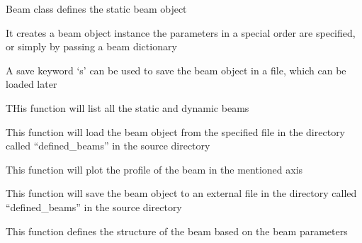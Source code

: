 \documentclass[letterpaper,10pt,english]{sphinxmanual}
\begin{document}

\begin{fulllineitems}
\label{beam:beam.staticbeam}
Beam class defines the static beam object

It creates a beam object instance the parameters in a special order are specified, or simply by passing a beam dictionary

A save keyword `s' can be used to save the beam object in a file, which can be loaded later

\begin{fulllineitems}
\label{beam:beam.staticbeam.listfiles}
THis function will list all the static and dynamic beams

\end{fulllineitems}


\begin{fulllineitems}
\label{beam:beam.staticbeam.load}
This function will load the beam object from the specified file in the directory called ``defined\_beams'' in the source directory

\end{fulllineitems}


\begin{fulllineitems}
\label{beam:beam.staticbeam.plot}
This function will plot the profile of the beam in the mentioned axis

\end{fulllineitems}


\begin{fulllineitems}
\label{beam:beam.staticbeam.save}
This function will save the beam object to an external file in the directory called ``defined\_beams'' in the source directory

\end{fulllineitems}


\begin{fulllineitems}
\label{beam:beam.staticbeam.structure}
This function defines the structure of the beam based on the beam parameters

\end{fulllineitems}


\end{fulllineitems}
\end{document}
